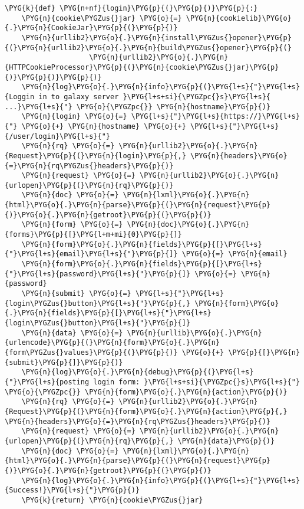 \begin{Verbatim}[commandchars=\\\{\}]
\PYG{k}{def} \PYG{n+nf}{login}\PYG{p}{(}\PYG{p}{)}\PYG{p}{:}
    \PYG{n}{cookie\PYGZus{}jar} \PYG{o}{=} \PYG{n}{cookielib}\PYG{o}{.}\PYG{n}{CookieJar}\PYG{p}{(}\PYG{p}{)}
    \PYG{n}{urllib2}\PYG{o}{.}\PYG{n}{install\PYGZus{}opener}\PYG{p}{(}\PYG{n}{urllib2}\PYG{o}{.}\PYG{n}{build\PYGZus{}opener}\PYG{p}{(}
                    \PYG{n}{urllib2}\PYG{o}{.}\PYG{n}{HTTPCookieProcessor}\PYG{p}{(}\PYG{n}{cookie\PYGZus{}jar}\PYG{p}{)}\PYG{p}{)}\PYG{p}{)}
    \PYG{n}{log}\PYG{o}{.}\PYG{n}{info}\PYG{p}{(}\PYG{l+s}{"}\PYG{l+s}{Loggin in to galaxy server }\PYG{l+s+si}{\PYGZpc{}s}\PYG{l+s}{ ...}\PYG{l+s}{"} \PYG{o}{\PYGZpc{}} \PYG{n}{hostname}\PYG{p}{)}
    \PYG{n}{login} \PYG{o}{=} \PYG{l+s}{"}\PYG{l+s}{https://}\PYG{l+s}{"} \PYG{o}{+} \PYG{n}{hostname} \PYG{o}{+} \PYG{l+s}{"}\PYG{l+s}{/user/login}\PYG{l+s}{"}
    \PYG{n}{rq} \PYG{o}{=} \PYG{n}{urllib2}\PYG{o}{.}\PYG{n}{Request}\PYG{p}{(}\PYG{n}{login}\PYG{p}{,} \PYG{n}{headers}\PYG{o}{=}\PYG{n}{rq\PYGZus{}headers}\PYG{p}{)}
    \PYG{n}{request} \PYG{o}{=} \PYG{n}{urllib2}\PYG{o}{.}\PYG{n}{urlopen}\PYG{p}{(}\PYG{n}{rq}\PYG{p}{)}
    \PYG{n}{doc} \PYG{o}{=} \PYG{n}{lxml}\PYG{o}{.}\PYG{n}{html}\PYG{o}{.}\PYG{n}{parse}\PYG{p}{(}\PYG{n}{request}\PYG{p}{)}\PYG{o}{.}\PYG{n}{getroot}\PYG{p}{(}\PYG{p}{)}
    \PYG{n}{form} \PYG{o}{=} \PYG{n}{doc}\PYG{o}{.}\PYG{n}{forms}\PYG{p}{[}\PYG{l+m+mi}{0}\PYG{p}{]}
    \PYG{n}{form}\PYG{o}{.}\PYG{n}{fields}\PYG{p}{[}\PYG{l+s}{"}\PYG{l+s}{email}\PYG{l+s}{"}\PYG{p}{]} \PYG{o}{=} \PYG{n}{email}
    \PYG{n}{form}\PYG{o}{.}\PYG{n}{fields}\PYG{p}{[}\PYG{l+s}{"}\PYG{l+s}{password}\PYG{l+s}{"}\PYG{p}{]} \PYG{o}{=} \PYG{n}{password}
    \PYG{n}{submit} \PYG{o}{=} \PYG{l+s}{"}\PYG{l+s}{login\PYGZus{}button}\PYG{l+s}{"}\PYG{p}{,} \PYG{n}{form}\PYG{o}{.}\PYG{n}{fields}\PYG{p}{[}\PYG{l+s}{"}\PYG{l+s}{login\PYGZus{}button}\PYG{l+s}{"}\PYG{p}{]}
    \PYG{n}{data} \PYG{o}{=} \PYG{n}{urllib}\PYG{o}{.}\PYG{n}{urlencode}\PYG{p}{(}\PYG{n}{form}\PYG{o}{.}\PYG{n}{form\PYGZus{}values}\PYG{p}{(}\PYG{p}{)} \PYG{o}{+} \PYG{p}{[}\PYG{n}{submit}\PYG{p}{]}\PYG{p}{)}
    \PYG{n}{log}\PYG{o}{.}\PYG{n}{debug}\PYG{p}{(}\PYG{l+s}{"}\PYG{l+s}{posting login form: }\PYG{l+s+si}{\PYGZpc{}s}\PYG{l+s}{"} \PYG{o}{\PYGZpc{}} \PYG{n}{form}\PYG{o}{.}\PYG{n}{action}\PYG{p}{)}
    \PYG{n}{rq} \PYG{o}{=} \PYG{n}{urllib2}\PYG{o}{.}\PYG{n}{Request}\PYG{p}{(}\PYG{n}{form}\PYG{o}{.}\PYG{n}{action}\PYG{p}{,} \PYG{n}{headers}\PYG{o}{=}\PYG{n}{rq\PYGZus{}headers}\PYG{p}{)}
    \PYG{n}{request} \PYG{o}{=} \PYG{n}{urllib2}\PYG{o}{.}\PYG{n}{urlopen}\PYG{p}{(}\PYG{n}{rq}\PYG{p}{,} \PYG{n}{data}\PYG{p}{)}
    \PYG{n}{doc} \PYG{o}{=} \PYG{n}{lxml}\PYG{o}{.}\PYG{n}{html}\PYG{o}{.}\PYG{n}{parse}\PYG{p}{(}\PYG{n}{request}\PYG{p}{)}\PYG{o}{.}\PYG{n}{getroot}\PYG{p}{(}\PYG{p}{)}
    \PYG{n}{log}\PYG{o}{.}\PYG{n}{info}\PYG{p}{(}\PYG{l+s}{"}\PYG{l+s}{Success!}\PYG{l+s}{"}\PYG{p}{)}
    \PYG{k}{return} \PYG{n}{cookie\PYGZus{}jar}


\end{Verbatim}
